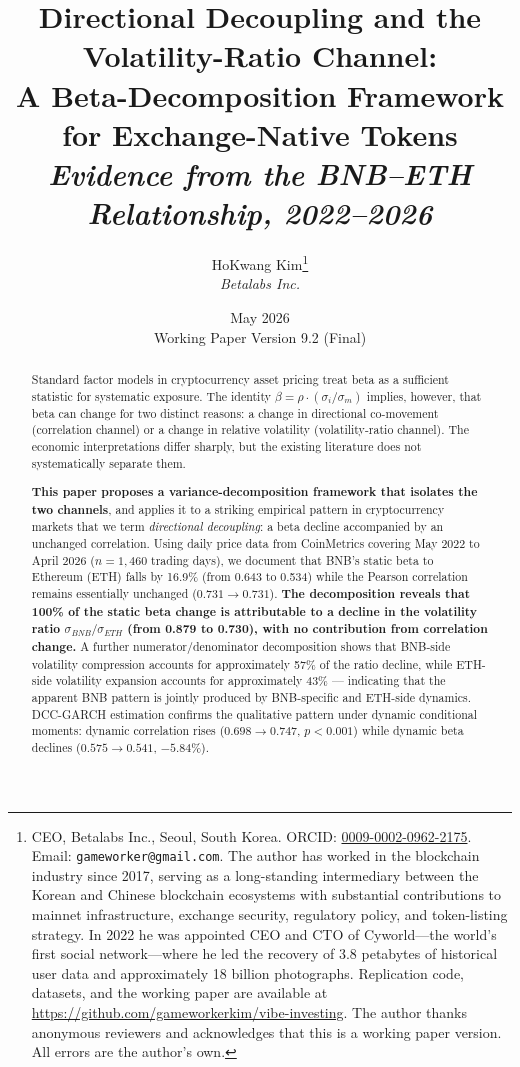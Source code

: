 \documentclass[11pt,a4paper]{article}
\title{\textbf{Directional Decoupling and the Volatility-Ratio Channel: \\
A Beta-Decomposition Framework for Exchange-Native Tokens \\[0.3em]
\large\normalfont\itshape Evidence from the BNB--ETH Relationship, 2022--2026}}
\author{
HoKwang Kim\thanks{CEO, Betalabs Inc., Seoul, South Korea. ORCID: \href{https://orcid.org/0009-0002-0962-2175}{0009-0002-0962-2175}. Email: \texttt{gameworker@gmail.com}. The author has worked in the blockchain industry since 2017, serving as a long-standing intermediary between the Korean and Chinese blockchain ecosystems with substantial contributions to mainnet infrastructure, exchange security, regulatory policy, and token-listing strategy. In 2022 he was appointed CEO and CTO of Cyworld---the world's first social network---where he led the recovery of 3.8 petabytes of historical user data and approximately 18 billion photographs. Replication code, datasets, and the working paper are available at \url{https://github.com/gameworkerkim/vibe-investing}. The author thanks anonymous reviewers and acknowledges that this is a working paper version. All errors are the author's own.} \\
\textit{Betalabs Inc.}
}
\date{May 2026 \\ \small Working Paper Version 9.2 (Final)}
\begin{document}
\maketitle
\onehalfspacing

\begin{abstract}
\noindent Standard factor models in cryptocurrency asset pricing \citep{liu2021,liu2024} treat beta as a sufficient statistic for systematic exposure. The identity $\beta = \rho \cdot (\sigma_i/\sigma_m)$ implies, however, that beta can change for two distinct reasons: a change in directional co-movement (correlation channel) or a change in relative volatility (volatility-ratio channel). The economic interpretations differ sharply, but the existing literature does not systematically separate them.

\textbf{This paper proposes a variance-decomposition framework that isolates the two channels}, and applies it to a striking empirical pattern in cryptocurrency markets that we term \textit{directional decoupling}: a beta decline accompanied by an unchanged correlation. Using daily price data from CoinMetrics covering May 2022 to April 2026 ($n=1{,}460$ trading days), we document that BNB's static beta to Ethereum (ETH) falls by 16.9\% (from 0.643 to 0.534) while the Pearson correlation remains essentially unchanged ($0.731 \to 0.731$). \textbf{The decomposition reveals that 100\% of the static beta change is attributable to a decline in the volatility ratio $\sigma_{BNB}/\sigma_{ETH}$ (from 0.879 to 0.730), with no contribution from correlation change.} A further numerator/denominator decomposition shows that BNB-side volatility compression accounts for approximately 57\% of the ratio decline, while ETH-side volatility expansion accounts for approximately 43\% --- indicating that the apparent BNB pattern is jointly produced by BNB-specific and ETH-side dynamics. DCC-GARCH \citep{engle2002} estimation confirms the qualitative pattern under dynamic conditional moments: dynamic correlation rises ($0.698 \to 0.747$, $p<0.001$) while dynamic beta declines ($0.575 \to 0.541$, $-5.84\%$).


\end{abstract}
\end{document}
